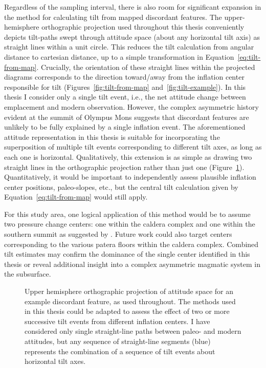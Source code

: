 Regardless of the sampling interval, there is also room for significant expansion in the method for calculating tilt from mapped discordant features. The upper-hemisphere orthographic projection used throughout this thesis conveniently depicts tilt-paths swept through attitude space (about any horizontal tilt axis) as straight lines within a unit circle. This reduces the tilt calculation from angular distance to cartesian distance, up to a simple transformation in Equation~\eqref{eq:tilt-from-map}. Crucially, the orientation of these straight lines within the projected diagrams corresponds to the direction toward/away from the inflation center responsible for tilt (Figures~\ref{fig:tilt-from-map} and~\ref{fig:tilt-example}). In this thesis I consider only a single tilt event, i.e., the net attitude change between emplacement and modern observation. However, the complex asymmetric history evident at the summit of Olympus Mons suggests that discordant features are unlikely to be fully explained by a single inflation event. The aforementioned attitude representation in this thesis is suitable for incorporating the superposition of multiple tilt events corresponding to different tilt axes, as long as each one is horizontal. Qualitatively, this extension is as simple as drawing two straight lines in the orthographic projection rather than just one (Figure~\ref{fig:multiple-tilt}). Quantitatively, it would be important to independently assess plausible inflation center positions, paleo-slopes, etc., but the central tilt calculation given by Equation~\eqref{eq:tilt-from-map} would still apply.

For this study area, one logical application of this method would be to assume two pressure change centers: one within the caldera complex and one within the southern summit as suggested by \textcite{mouginis-mark_late-stage_2019}. Future work could also target centers corresponding to the various patera floors within the caldera complex. Combined tilt estimates may confirm the dominance of the single center identified in this thesis or reveal additional insight into a complex asymmetric magmatic system in the subsurface. 

\begin{figure}
    {\caption[Multiple tilt events]{Upper hemisphere orthographic projection of attitude space for an example discordant feature, as used throughout. The methods used in this thesis could be adapted to assess the effect of two or more successive tilt events from different inflation centers. I have considered only single straight-line paths between paleo- and modern attitudes, but any sequence of straight-line segments (blue) represents the combination of a sequence of tilt events about horizontal tilt axes. 
    }\label{fig:multiple-tilt}}
    {}
\end{figure}

